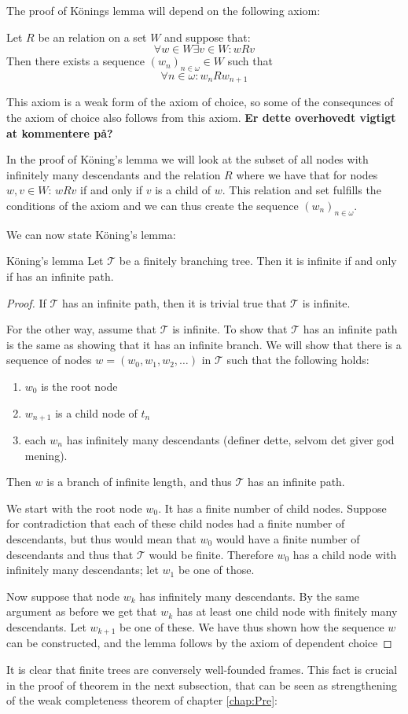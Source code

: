 \documentclass[../main.tex]{subfiles}
\begin{document}
The proof of Könings lemma will depend on the following axiom:
\begin{axiom}
	Let $R$ be an relation on a set $W$ and suppose that:
	\[\forall w\in W\exists v\in W: wRv\]
	Then there exists a sequence $(w_n)_{n\in\omega}\in W$ such that
	\[\forall n\in\omega: w_nRw_{n+1}\]
\end{axiom}

This axiom is a weak form of the axiom of choice, so some of the consequnces of
the axiom of choice also follows from this axiom. \textbf{Er dette overhovedt
vigtigt at kommentere på?}

In the proof of Köning's
lemma we will look at the subset of all nodes with infinitely many descendants
and the relation $R$ where we have that for nodes $w,v\in W$:  $wRv$ if and only if $v$ is a child of $w$. This relation and
set
fulfills the conditions of the axiom and we can thus create the sequence
$(w_n)_{n\in\omega}$.

We can now state Köning's lemma:
\begin{lemma}{Köning's lemma}
	\label{lem:kong}
	Let $\mathcal{T}$ be a finitely branching tree. Then it is infinite if
	and only if has an infinite path.
\end{lemma}
\begin{proof}
	If $\mathcal{T}$ has an infinite path, then it is trivial true that
	$\mathcal{T}$ is infinite. 

	For the other way, assume that $\mathcal{T}$ is infinite. To show that
	$\mathcal{T}$ has an infinite path is the same as showing that it has
	an infinite branch. We will show that there is a sequence of nodes
	$w=(w_0,w_1,w_2,\ldots)$ in $\mathcal{T}$ such that the following holds:
	\begin{enumerate}
		\item $w_0$ is the root node
		\item $w_{n+1}$ is a child node of $t_n$
		\item each $w_n$ has infinitely many descendants (definer
			dette, selvom det giver god mening).
	\end{enumerate}
	Then $w$ is a branch of infinite length, and thus $\mathcal{T}$ has an
	infinite path.

	We start with the root node $w_0$. It has a finite number of child
	nodes. Suppose for contradiction that each of these child nodes had a
	finite number of descendants, but thus would mean that $w_0$ would have
	a finite number of descendants and thus that $\mathcal{T}$ would be
	finite. Therefore $w_0$ has a child node with infinitely many
	descendants; let $w_1$ be one of those.

	Now suppose that node $w_k$ has infinitely many descendants. By the
	same argument as before we get that $w_k$ has at least one child node
	with finitely many descendants. Let $w_{k+1}$ be one of these. We have
	thus shown how the sequence $w$ can be constructed, and the lemma
	follows by the axiom of dependent choice
\end{proof}
It is clear that finite trees are conversely well-founded frames. This fact is crucial
in the proof of theorem in the next subsection, that can be seen as strengthening of the
weak completeness theorem of chapter \ref{chap:Pre}:
\end{document}
